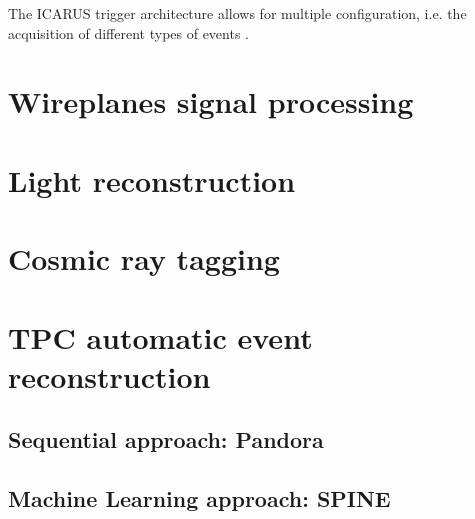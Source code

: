 The ICARUS trigger architecture allows for multiple configuration, i.e. the acquisition of different types of events \cite{ICARUS:2025kai}. 

\section{Wireplanes signal processing}

\section{Light reconstruction}

\section{Cosmic ray tagging}

\section{TPC automatic event reconstruction}

\subsection{Sequential approach: Pandora}

\subsection{Machine Learning approach: SPINE}
